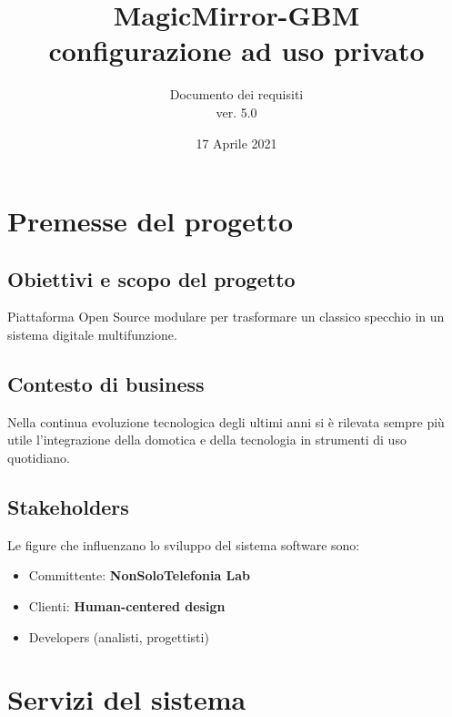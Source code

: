 \documentclass[a4paper,11pt,titlepage]{article}       %
\begin{document}
\author{Documento dei requisiti \\ ver. 5.0}                             %
\title{MagicMirror-GBM \\ configurazione ad uso privato}                    %
\date{17 Aprile 2021}                                %
\maketitle

\tableofcontents
\newpage


\section{Premesse del progetto}
    \subsection{Obiettivi e scopo del progetto}
        Piattaforma Open Source modulare per trasformare un classico specchio in un sistema digitale multifunzione.
    \subsection{Contesto di business}
        Nella continua evoluzione tecnologica degli ultimi anni si è rilevata sempre più utile l'integrazione della domotica e della tecnologia in strumenti di uso quotidiano.
    \subsection{Stakeholders}
        Le figure che influenzano lo sviluppo del sistema software sono:
        \begin{itemize}
            \item Committente: \textbf{NonSoloTelefonia Lab}
            \item Clienti: \textbf{\gls{Human-centered design}}
            \item Developers (analisti, progettisti)
        \end{itemize}

\newpage

\section{Servizi del sistema}
    
\end{document}
